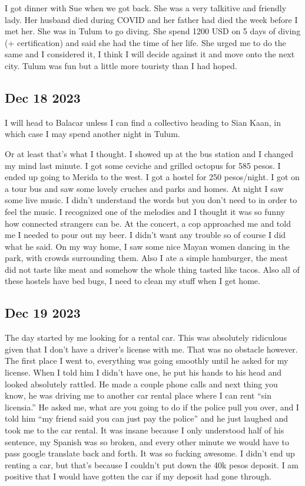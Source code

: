 \documentclass[12pt]{article}
\begin{document}
\hfill

I got dinner with Sue when we got back. She was a very talkitive and friendly lady. Her husband died during COVID and her father
had died the week before I met her. She was in Tulum to go diving. She spend 1200 USD on 5 days of diving (+ certification)
and said she had the time of her life. She urged me to do the same and I considered it, I think I will decide against it and move onto
the next city. Tulum was fun but a little more touristy than I had hoped. 

\subsection{Dec 18 2023}
I will head to Balacar unless I can find a collectivo heading to Sian Kaan, in which case I may spend another night in Tulum.

Or at least that's what I thought. I showed up at the bus station and I changed my mind last minute. I got some ceviche and grilled octopus for 585 pesos.
I ended up going to Merida to the west. I got a hostel for 250 pesos/night. I got on a tour bus and saw some lovely cruches and parks and homes. 
At night I saw some live music. I didn't understand the words but you don't need to in order to feel the music. I recognized one of the melodies 
and I thought it was so funny how connected strangers can be. At the concert, a cop approached me and told me I needed to pour out my beer.
I didn't want any trouble so of course I did what he said. On my way home, I saw some nice Mayan women dancing in the park, with crowds surrounding them.
Also I ate a simple hamburger, the meat did not taste like meat and somehow the whole thing tasted like tacos. Also all of these hostels have
bed bugs, I need to clean my stuff when I get home.

\subsection{Dec 19 2023}
The day started by me looking for a rental car. This was absolutely ridiculous given that I don't have a driver's license with me. That was no obstacle however. 
The first place I went to, everything was going smoothly until he asked for my license. 
When I told him I didn’t have one, he put his hands to his head and looked absolutely rattled. 
He made a couple phone calls and next thing you know, he was driving me to another car rental place where I can rent “sin licensia.” 
He asked me, what are you going to do if the police pull you over, and I told him “my friend said you can just pay the police” and
 he just laughed and took me to the car rental. It was insane because I only understood half of his sentence, my Spanish was so broken, and every other minute we would have to pass google translate back and forth. It was so fucking awesome. I didn’t end up renting a car, but that’s because I couldn’t put down the 40k pesos deposit. I am positive that I would have gotten the car if my deposit had gone through.
\end{document}
